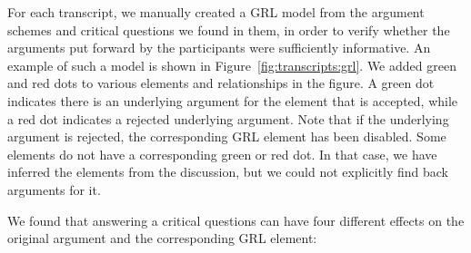 For each transcript, we manually created a GRL model from the argument schemes and critical questions we found in them, in order to verify whether the arguments put forward by the participants were sufficiently informative. An example of such a model is shown in Figure~\ref{fig:transcripts:grl}. We added green and red dots to various elements and relationships in the figure. A green dot indicates there is an underlying argument for the element that is accepted, while a red dot indicates a rejected underlying argument. Note that if the underlying argument is rejected, the corresponding GRL element has been disabled. Some elements do not have a corresponding green or red dot. In that case, we have inferred the elements from the discussion, but we could not explicitly find back arguments for it.

We found that answering a critical questions can have four different effects on the original argument and the corresponding GRL element:

